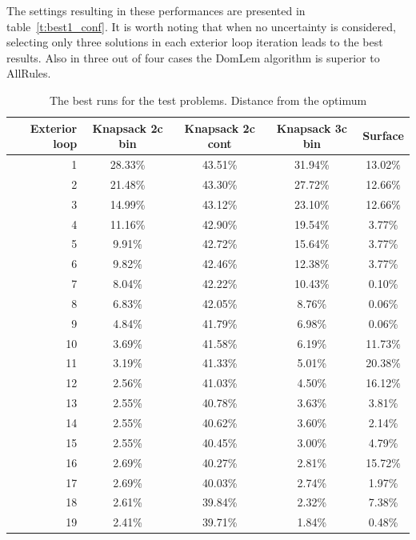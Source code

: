 The settings resulting in these performances are presented in
table~\ref{t:best1_conf}. It is worth noting that when no uncertainty is
considered, selecting only three solutions in each exterior loop iteration
leads to the best results. Also in three out of four cases the DomLem
algorithm is superior to AllRules.

\begin{table}[h]
  \centering
  \begin{tabular}{r c c c c}
    \hline
    Exterior loop & Knapsack 2c bin & Knapsack 2c cont & Knapsack 3c bin & Surface \\
    \hline
    1 & 28.33\% & 43.51\% & 31.94\% & 13.02\% \\
    2 & 21.48\% & 43.30\% & 27.72\% & 12.66\% \\
    3 & 14.99\% & 43.12\% & 23.10\% & 12.66\% \\
    4 & 11.16\% & 42.90\% & 19.54\% & 3.77\% \\
    5 & 9.91\% & 42.72\% & 15.64\% & 3.77\% \\
    6 & 9.82\% & 42.46\% & 12.38\% & 3.77\% \\
    7 & 8.04\% & 42.22\% & 10.43\% & 0.10\% \\
    8 & 6.83\% & 42.05\% & 8.76\% & 0.06\% \\
    9 & 4.84\% & 41.79\% & 6.98\% & 0.06\% \\
    10 & 3.69\% & 41.58\% & 6.19\% & 11.73\% \\
    11 & 3.19\% & 41.33\% & 5.01\% & 20.38\% \\
    12 & 2.56\% & 41.03\% & 4.50\% & 16.12\% \\
    13 & 2.55\% & 40.78\% & 3.63\% & 3.81\% \\
    14 & 2.55\% & 40.62\% & 3.60\% & 2.14\% \\
    15 & 2.55\% & 40.45\% & 3.00\% & 4.79\% \\
    16 & 2.69\% & 40.27\% & 2.81\% & 15.72\% \\
    17 & 2.69\% & 40.03\% & 2.74\% & 1.97\% \\
    18 & 2.61\% & 39.84\% & 2.32\% & 7.38\% \\
    19 & 2.41\% & 39.71\% & 1.84\% & 0.48\% \\
    \hline
  \end{tabular}
  \caption{The best runs for the test problems. Distance from the optimum}
  \label{t:best1}
\end{table} 

